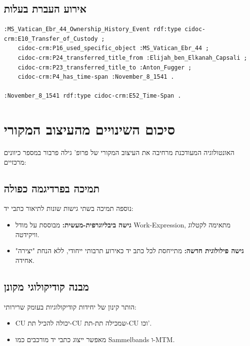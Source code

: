 \documentclass[12pt,a4paper]{article}
\newcommand{\new}[1]{\textcolor{newaddition}{#1}}
\begin{document}
\subsection{אירוע העברת בעלות}

\begin{LTR}
\begin{verbatim}
:MS_Vatican_Ebr_44_Ownership_History_Event rdf:type cidoc-crm:E10_Transfer_of_Custody ;
    cidoc-crm:P16_used_specific_object :MS_Vatican_Ebr_44 ;
    cidoc-crm:P24_transferred_title_from :Elijah_ben_Elkanah_Capsali ;
    cidoc-crm:P23_transferred_title_to :Anton_Fugger ;
    cidoc-crm:P4_has_time-span :November_8_1541 .

:November_8_1541 rdf:type cidoc-crm:E52_Time-Span .
\end{verbatim}
\end{LTR}

\newpage

\section{סיכום השינויים מהעיצוב המקורי}

האונטולוגיה המעודכנת מרחיבה את העיצוב המקורי של פרופ' גילה פרבור במספר כיוונים מרכזיים:

\subsection{תמיכה בפרדיגמה כפולה}

\new{נוספה תמיכה בשתי גישות שונות לתיאור כתבי יד:}
\begin{itemize}
\item \new{\textbf{גישה ביבליוגרפית-מעשית:} מבוססת על מודל Work-Expression, מתאימה לקטלוג וויקידטה.}
\item \new{\textbf{גישה פילולוגית חדשה:} מתייחסת לכל כתב יד כאירוע תרבותי ייחודי, ללא הנחת "יצירה" אחידה.}
\end{itemize}

\subsection{מבנה קודיקולוגי מקונן}

\new{הותר קינון של יחידות קודיקולוגיות בעומק שרירותי:}
\begin{itemize}
\item \new{CU יכולה להכיל תת-CU שמכילה תת-תת-CU וכו'.}
\item \new{מאפשר ייצוג כתבי יד מורכבים כמו Sammelbands ו-MTM.}
\end{itemize}
\end{document}
